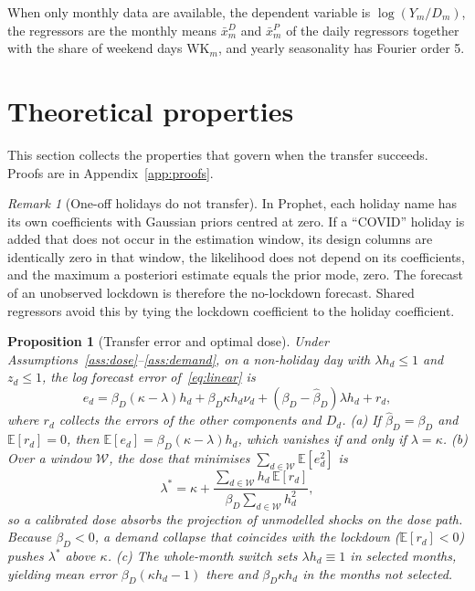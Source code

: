 \documentclass{article}
\theoremstyle{plain}
\newtheorem{proposition}{Proposition}
\theoremstyle{definition}
\theoremstyle{remark}
\newtheorem{remark}{Remark}
\newcommand{\E}{\mathbb{E}}
\begin{document}
When only monthly data are available, the dependent variable is $\log(Y_m/D_m)$, the regressors are the monthly means $\bar x^D_m$ and $\bar x^P_m$ of the daily regressors together with the share of weekend days $\mathrm{WK}_m$, and yearly seasonality has Fourier order 5.

\section{Theoretical properties}\label{sec:theory}
This section collects the properties that govern when the transfer succeeds. Proofs are in Appendix~\ref{app:proofs}.

\begin{remark}[One-off holidays do not transfer]\label{rem:oneoff}
In Prophet, each holiday name has its own coefficients with Gaussian priors centred at zero. If a ``COVID'' holiday is added that does not occur in the estimation window, its design columns are identically zero in that window, the likelihood does not depend on its coefficients, and the maximum a posteriori estimate equals the prior mode, zero. The forecast of an unobserved lockdown is therefore the no-lockdown forecast. Shared regressors avoid this by tying the lockdown coefficient to the holiday coefficient.
\end{remark}

\begin{proposition}[Transfer error and optimal dose]\label{prop:transfer}
Under Assumptions~\ref{ass:dose}--\ref{ass:demand}, on a non-holiday day with $\lambda h_d\le 1$ and $z_d\le 1$, the log forecast error of~\eqref{eq:linear} is
\begin{equation}\label{eq:error}
e_d = \beta_D(\kappa-\lambda)h_d + \beta_D\kappa h_d\nu_d + (\beta_D-\hat\beta_D)\lambda h_d + r_d ,
\end{equation}
where $r_d$ collects the errors of the other components and $D_d$. (a) If $\hat\beta_D=\beta_D$ and $\E[r_d]=0$, then $\E[e_d]=\beta_D(\kappa-\lambda)h_d$, which vanishes if and only if $\lambda=\kappa$. (b) Over a window $\mathcal{W}$, the dose that minimises $\sum_{d\in\mathcal{W}}\E[e_d^2]$ is
\begin{equation}\label{eq:lamstar}
\lambda^{*} = \kappa + \frac{\sum_{d\in\mathcal{W}} h_d\,\E[r_d]}{\beta_D\sum_{d\in\mathcal{W}} h_d^2},
\end{equation}
so a calibrated dose absorbs the projection of unmodelled shocks on the dose path. Because $\beta_D<0$, a demand collapse that coincides with the lockdown ($\E[r_d]<0$) pushes $\lambda^{*}$ above $\kappa$. (c) The whole-month switch sets $\lambda h_d\equiv1$ in selected months, yielding mean error $\beta_D(\kappa h_d-1)$ there and $\beta_D\kappa h_d$ in the months not selected.
\end{proposition}
\end{document}
